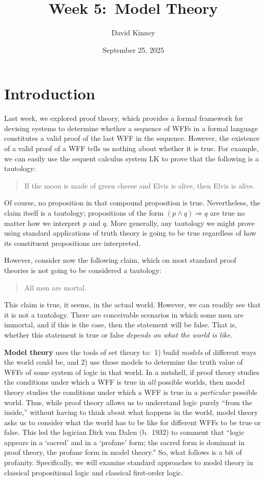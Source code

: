 \documentclass[11pt]{article}
\title{Week 5:\ Model Theory}
\author{David Kinney}
\date{September 25, 2025}
\theoremstyle{definition}
\theoremstyle{remark}
\begin{document}
\maketitle

\section{Introduction}
Last week, we explored proof theory, which provides a formal framework for devising systems to determine whether a sequence of WFFs in a formal language constitutes a valid proof of the last WFF in the sequence. However, the existence of a valid proof of a WFF tells us nothing about whether it is true. For example, we can easily use the sequent calculus system LK to prove that the following is a tautology:
\begin{quote}
    If the moon is made of green cheese and Elvis is alive, then Elvis is alive. 
\end{quote}
Of course, no proposition in that compound proposition is true. Nevertheless, the claim itself is a tautology; propositions of the form $(p\wedge q)\Rightarrow q$ are true no matter how we interpret $p$ and $q$. More generally, any tautology we might prove using standard applications of truth theory is going to be true regardless of how its constituent propositions are interpreted.\par

However, consider now the following claim, which on most standard proof theories is not going to be considered a tautology:
\begin{quote}
    All men are mortal. 
\end{quote}
This claim is true, it seems, in the actual world. However, we can readily see that it is not a tautology. There are conceivable scenarios in which some men are immortal, and if this is the case, then the statement will be false. That is, whether this statement is true or false \textit{depends on what the world is like}.

\textbf{Model theory} uses the tools of set theory to:\ 1) build \textit{models} of different ways the world could be, and 2) use those models to determine the truth value of WFFs of some system of logic in that world. In a nutshell, if proof theory studies the conditions under which a WFF is true in \textit{all} possible worlds, then model theory studies the conditions under which a WFF is true in a \textit{particular} possible world. Thus, while proof theory allows us to understand logic purely ``from the inside,'' without having to think about what happens in the world, model theory asks us to consider what the world has to be like for different WFFs to be true or false. This led the logician Dirk van Dalen (b.\ 1932) to comment that ``logic appears in a `sacred’ and in a `profane’ form; the sacred form is dominant in proof theory, the profane form in model theory." So, what follows is a bit of profanity. Specifically, we will examine standard approaches to model theory in classical propositional logic and classical first-order logic.\par 
\end{document}
